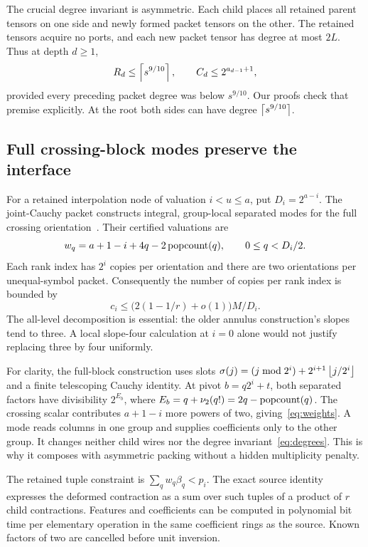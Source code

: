 The crucial degree invariant is asymmetric. Each child places all retained
parent tensors on one side and newly formed packet tensors on the other.
The retained tensors acquire no ports, and each new packet tensor has degree
at most $2L$. Thus at depth $d\ge1$,
\begin{equation}\label{eq:degrees}
 R_d\le\left\lceil s^{9/10}\right\rceil,\qquad C_d\le2^{a_{d-1}+1},
\end{equation}
provided every preceding packet degree was below $s^{9/10}$. Our proofs check
that premise explicitly. At the root both sides can have degree
$\left\lceil s^{9/10}\right\rceil$.

\subsection{Full crossing-block modes preserve the interface}
For a retained interpolation node of valuation $i<u\le a$, put
$D_i=2^{a-i}$. The joint-Cauchy packet constructs integral, group-local
separated modes for the full crossing orientation~\cite{joint}. Their
certified valuations are
\begin{equation}\label{eq:weights}
 w_q=a+1-i+4q-2\operatorname{popcount}(q),\qquad 0\le q<D_i/2.
\end{equation}
Each rank index has $2^i$ copies per orientation and there are two
orientations per unequal-symbol packet. Consequently the number of copies
per rank index is bounded by
\begin{equation}\label{eq:families}
 c_i\le\bigl(2(1-1/r)+o(1)\bigr)M/D_i.
\end{equation}
The all-level decomposition is essential: the older annulus construction's
slopes tend to three. A local slope-four calculation at $i=0$ alone would
not justify replacing three by four uniformly.

For clarity, the full-block construction uses slots
$\sigma(j)=(j\bmod2^i)+2^{i+1}\left\lfloor j/2^i\right\rfloor$ and a finite telescoping
Cauchy identity. At pivot $b=q2^i+t$, both separated factors have divisibility
$2^{E_b}$, where $E_b=q+\nu_2(q!)=2q-\operatorname{popcount}(q)$. The crossing scalar contributes
$a+1-i$ more powers of two, giving~\eqref{eq:weights}. A mode reads columns
in one group and supplies coefficients only to the other group. It changes
neither child wires nor the degree invariant~\eqref{eq:degrees}. This is why
it composes with asymmetric packing without a hidden multiplicity penalty.

The retained tuple constraint is $\sum_qw_q\beta_q<p_i$. The exact source
identity expresses the deformed contraction as a sum over such tuples of a
product of $r$ child contractions. Features and coefficients can be computed
in polynomial bit time per elementary operation in the same coefficient
rings as the source. Known factors of two are cancelled before unit inversion.

